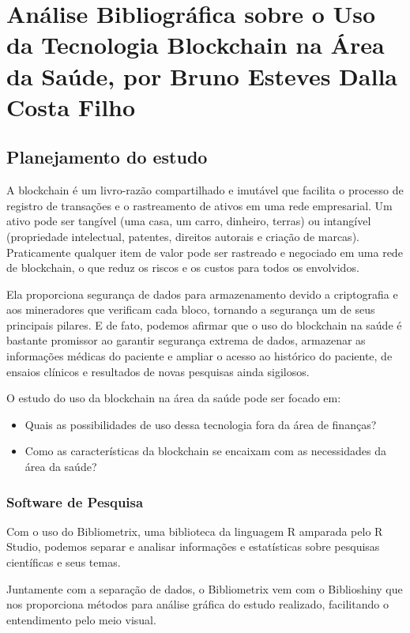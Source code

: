 \chapter{Análise Bibliográfica sobre o Uso da Tecnologia Blockchain na Área da Saúde, por Bruno Esteves Dalla Costa Filho}

\section{Planejamento do estudo}
A blockchain é um livro-razão compartilhado e imutável que facilita o processo de registro de transações e o rastreamento de ativos em uma rede empresarial. Um ativo pode ser tangível (uma casa, um carro, dinheiro, terras) ou intangível (propriedade intelectual, patentes, direitos autorais e criação de marcas). Praticamente qualquer item de valor pode ser rastreado e negociado em uma rede de blockchain, o que reduz os riscos e os custos para todos os envolvidos.

Ela proporciona segurança de dados para armazenamento devido a criptografia e aos mineradores que verificam cada bloco, tornando a segurança um de seus principais pilares. E de fato, podemos afirmar que o uso do blockchain na saúde é bastante promissor ao garantir segurança extrema de dados, armazenar as informações médicas do paciente e ampliar o acesso ao histórico do paciente, de ensaios clínicos e resultados de novas pesquisas ainda sigilosos.

O estudo do uso da blockchain na área da saúde pode ser focado em:

\begin{itemize}
    \item Quais as possibilidades de uso dessa tecnologia fora da área de finanças?
    \item Como as características da blockchain se encaixam com as necessidades da área da saúde?
\end{itemize}

\subsection{Software de Pesquisa}

Com o uso do Bibliometrix, uma biblioteca da linguagem R amparada pelo R Studio, podemos separar e analisar informações e estatísticas sobre pesquisas científicas e seus temas.

Juntamente com a separação de dados, o Bibliometrix vem com o Biblioshiny que nos proporciona métodos para análise gráfica do estudo realizado, facilitando o entendimento pelo meio visual.

